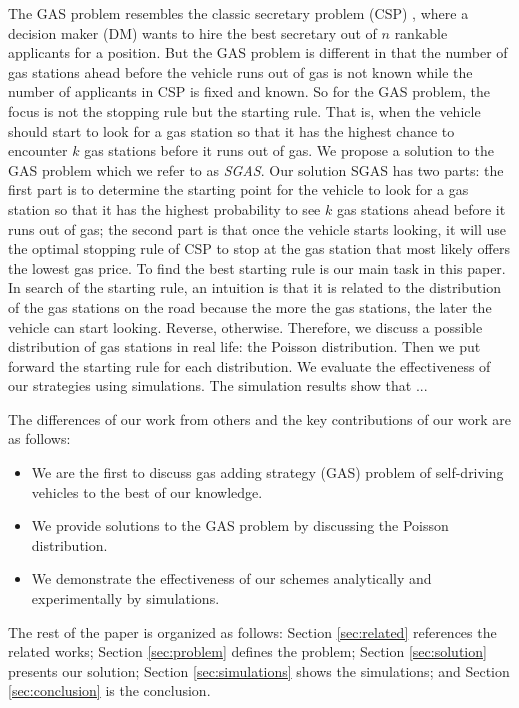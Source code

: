 \documentclass[conference]{IEEEtran}
\theoremstyle{definition}
\begin{document}
The GAS problem resembles the classic secretary problem (CSP) \cite{CSP}, where a decision maker (DM) wants to hire the best secretary out of $n$ rankable applicants for a position. But the GAS problem is different in that the number of gas stations ahead before the vehicle runs out of gas is not known while the number of applicants in CSP is fixed and known. So for the GAS problem, the focus is not the stopping rule but the starting rule. That is,  when the vehicle should start to look for a gas station so that it has the highest chance to encounter $k$ gas stations  before it runs out of gas. We propose a solution to the GAS problem which we refer to as {\em SGAS}. Our solution SGAS has two parts: the first part is to determine the starting point for the vehicle to look for a gas station so that it has the highest probability to see $k$ gas stations ahead before it runs out of gas; the second part is that once the vehicle starts looking, it will use the optimal stopping rule of CSP to stop at the gas station that most likely offers the lowest gas price. To find the best starting rule is our main task in this paper. In search of the starting rule, an intuition is that it is related to the distribution of the gas stations on the road because the more the gas stations, the later the vehicle can start looking. Reverse, otherwise. Therefore, we discuss a possible distribution of gas stations in real life:  the Poisson distribution. Then we put forward the starting rule for each distribution.  We evaluate the effectiveness of our strategies using simulations. The simulation results show that ...

The differences of our work from others and the key contributions of our work are as follows:
\begin{itemize}
\item We are the first to discuss gas adding strategy (GAS) problem of self-driving vehicles to the best of our knowledge.
\item We provide solutions to the GAS problem by discussing the Poisson distribution.
\item We demonstrate the effectiveness of our schemes analytically and experimentally by simulations.
\end{itemize}

The rest of the paper is organized as follows: Section \ref{sec:related} references the related works;  Section \ref{sec:problem} defines the problem;  Section \ref{sec:solution} presents our solution; 
Section \ref{sec:simulations} shows the simulations; and Section \ref{sec:conclusion} is the conclusion.
\end{document}
